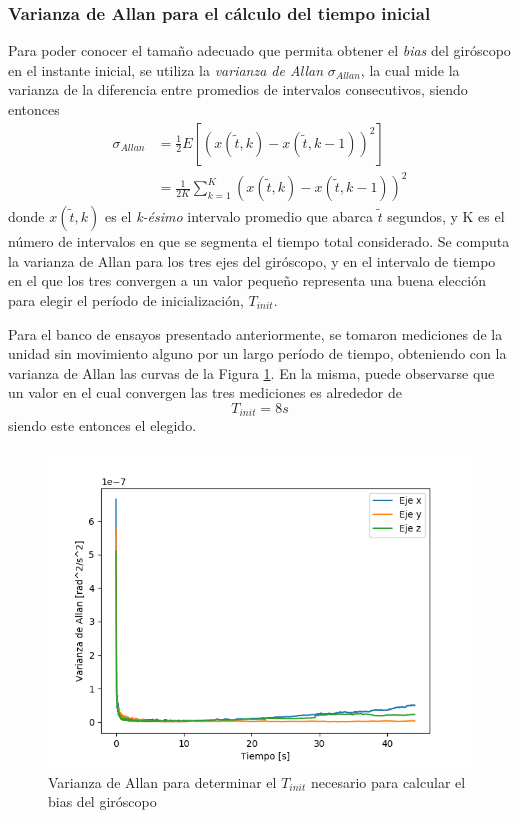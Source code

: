\subsubsection{Varianza de Allan para el cálculo del tiempo inicial}
Para poder conocer el tamaño adecuado que permita obtener el \textit{bias} del giróscopo en el instante inicial, se utiliza la \textit{varianza de Allan} \cite{sabatini2006}\cite{fong2008} $\sigma_{Allan}$, la cual mide la varianza de la diferencia entre promedios de intervalos consecutivos, siendo entonces
\begin{align}
    \sigma_{Allan} &= \frac{1}{2} E[(x(\tilde{t},k) - x(\tilde{t},k-1))^2] \\
    &= \frac{1}{2K}\sum_{k=1}^K(x(\tilde{t},k) - x(\tilde{t},k-1))^2
\end{align}
donde $x(\tilde{t},k)$ es el \textit{k-ésimo} intervalo promedio que abarca $\tilde{t}$ segundos, y K es el número de intervalos en que se segmenta el tiempo total considerado. Se computa la varianza de Allan para los tres ejes del giróscopo, y en el intervalo de tiempo en el que los tres convergen a un valor pequeño representa una buena elección para elegir el período de inicialización, $T_{init}$.

Para el banco de ensayos presentado anteriormente, se tomaron mediciones de la unidad sin movimiento alguno por un largo período de tiempo, obteniendo con la varianza de Allan las curvas de la Figura \ref{fig:imugyrovariance}. En la misma, puede observarse que un valor en el cual convergen las tres mediciones es alrededor de
\begin{equation}
    T_{init} = 8 s
\end{equation}
siendo este entonces el elegido.
\begin{figure}
    \centering
    \includegraphics[width=\textwidth]{Img/IMUGyroVariance.png}
    \caption{Varianza de Allan para determinar el $T_{init}$ necesario para calcular el bias del giróscopo}
    \label{fig:imugyrovariance}
\end{figure}

